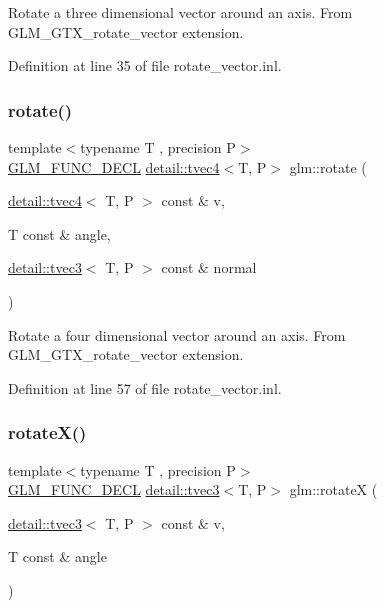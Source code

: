 Rotate a three dimensional vector around an axis. From G\+L\+M\+\_\+\+G\+T\+X\+\_\+rotate\+\_\+vector extension. 

Definition at line 35 of file rotate\+\_\+vector.\+inl.

\mbox{\label{group__gtx__rotate__vector_gac4abb6be47bd14303d6eded41f2f65f1}} 
\subsubsection{\texorpdfstring{rotate()}{rotate()}\hspace{0.1cm}{\footnotesize\ttfamily [3/3]}}
{\footnotesize\ttfamily template$<$typename T , precision P$>$ \\
\hyperlink{setup_8hpp_ab2d052de21a70539923e9bcbf6e83a51}{G\+L\+M\+\_\+\+F\+U\+N\+C\+\_\+\+D\+E\+CL} \hyperlink{structglm_1_1detail_1_1tvec4}{detail\+::tvec4}$<$T, P$>$ glm\+::rotate (\begin{DoxyParamCaption}\item[{\hyperlink{structglm_1_1detail_1_1tvec4}{detail\+::tvec4}$<$ T, P $>$ const \&}]{v,  }\item[{T const \&}]{angle,  }\item[{\hyperlink{structglm_1_1detail_1_1tvec3}{detail\+::tvec3}$<$ T, P $>$ const \&}]{normal }\end{DoxyParamCaption})}

Rotate a four dimensional vector around an axis. From G\+L\+M\+\_\+\+G\+T\+X\+\_\+rotate\+\_\+vector extension. 

Definition at line 57 of file rotate\+\_\+vector.\+inl.

\mbox{\label{group__gtx__rotate__vector_gadb69cdc8ea08715c9d8a74f587cf0eac}} 
\subsubsection{\texorpdfstring{rotate\+X()}{rotateX()}\hspace{0.1cm}{\footnotesize\ttfamily [1/2]}}
{\footnotesize\ttfamily template$<$typename T , precision P$>$ \\
\hyperlink{setup_8hpp_ab2d052de21a70539923e9bcbf6e83a51}{G\+L\+M\+\_\+\+F\+U\+N\+C\+\_\+\+D\+E\+CL} \hyperlink{structglm_1_1detail_1_1tvec3}{detail\+::tvec3}$<$T, P$>$ glm\+::rotateX (\begin{DoxyParamCaption}\item[{\hyperlink{structglm_1_1detail_1_1tvec3}{detail\+::tvec3}$<$ T, P $>$ const \&}]{v,  }\item[{T const \&}]{angle }\end{DoxyParamCaption})}

